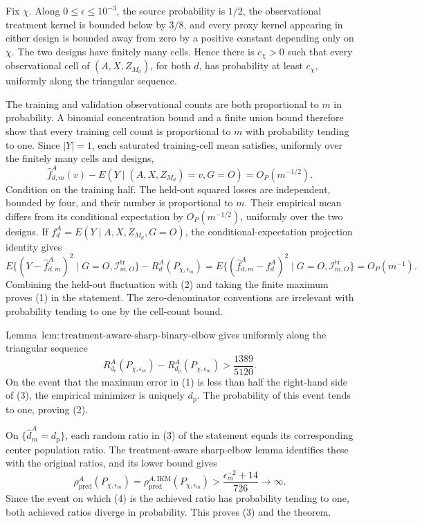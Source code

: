 Fix \(\chi\). Along \(0\le\epsilon\le10^{-3}\), the source probability is \(1/2\), the observational treatment kernel is bounded below by \(3/8\), and every proxy kernel appearing in either design is bounded away from zero by a positive constant depending only on \(\chi\). The two designs have finitely many cells. Hence there is \(c_\chi>0\) such that every observational cell of \((A,X,Z_{M_d})\), for both \(d\), has probability at least \(c_\chi\), uniformly along the triangular sequence.

The training and validation observational counts are both proportional to \(m\) in probability. A binomial concentration bound and a finite union bound therefore show that every training cell count is proportional to \(m\) with probability tending to one. Since \(|Y|=1\), each saturated training-cell mean satisfies, uniformly over the finitely many cells and designs,
\[
 \widehat f_{d,m}^A(v)-E(Y\mid (A,X,Z_{M_d})=v,G=O)=O_P(m^{-1/2}). \tag{1}
\]
Condition on the training half. The held-out squared losses are independent, bounded by four, and their number is proportional to \(m\). Their empirical mean differs from its conditional expectation by \(O_P(m^{-1/2})\), uniformly over the two designs. If \(f_d^A=E(Y\mid A,X,Z_{M_d},G=O)\), the conditional-expectation projection identity gives
\[
 E\{(Y-\widehat f_{d,m}^A)^2\mid G=O,\mathcal I_{m,O}^{\mathrm{tr}}\}
 -R_d^A(P_{\chi,\epsilon_m})
 =E\{(\widehat f_{d,m}^A-f_d^A)^2\mid G=O,\mathcal I_{m,O}^{\mathrm{tr}}\}
 =O_P(m^{-1}). \tag{2}
\]
Combining the held-out fluctuation with (2) and taking the finite maximum proves (1) in the statement. The zero-denominator conventions are irrelevant with probability tending to one by the cell-count bound.

Lemma~\(\mathrm{lem{:}treatment\text{-}aware\text{-}sharp\text{-}binary\text{-}elbow}\) gives uniformly along the triangular sequence
\[
 R_{d_{\mathrm e}}^A(P_{\chi,\epsilon_m})
 -R_{d_{\mathrm p}}^A(P_{\chi,\epsilon_m})
 >\frac{1389}{5120}. \tag{3}
\]
On the event that the maximum error in (1) is less than half the right-hand side of (3), the empirical minimizer is uniquely \(d_{\mathrm p}\). The probability of this event tends to one, proving (2).

On \(\{\widehat d_m^A=d_{\mathrm p}\}\), each random ratio in (3) of the statement equals its corresponding center population ratio. The treatment-aware sharp-elbow lemma identifies these with the original ratios, and its lower bound gives
\[
 \rho_{\mathrm{pred}}^A(P_{\chi,\epsilon_m})
 =\rho_{\mathrm{pred}}^{A,\mathrm{IKM}}(P_{\chi,\epsilon_m})
 >\frac{\epsilon_m^{-2}+14}{726}\longrightarrow\infty. \tag{4}
\]
Since the event on which (4) is the achieved ratio has probability tending to one, both achieved ratios diverge in probability. This proves (3) and the theorem.